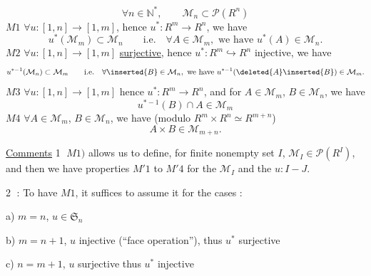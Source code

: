 \[
\forall n\in\mathbb N^*,\qquad\mathcal M_n\subset\mathcal P(R^n)
\]
\textcircled{\scriptsize$M1$} $\forall u:[1,n]\longrightarrow[1,m]$, hence $u^*:R^m\longrightarrow R^n$, we have
\[
u^*(\mathcal M_m)\subset\mathcal M_n\qquad\text{i.e.}\quad\forall A\in\mathcal M_m,\text{ we have }u^*(A)\in\mathcal M_n.
\]
\textcircled{\scriptsize$M2$} $\forall u:[1,n]\longrightarrow[1,m]$ \uline{surjective}, hence $u^*:R^m\hookrightarrow R^n$ injective, we have
\[
u^{*-1}(\mathcal M_n)\subset\mathcal M_m\qquad\text{i.e.}\quad\forall \inserted{B}\in\mathcal M_n,\text{ we have }u^{*-1}(\deleted{A}\inserted{B})\in\mathcal M_m.
\]
\textcircled{\scriptsize$M3$} $\forall u:[1,n]\longrightarrow[1,m]$ hence $u^*:R^m\longrightarrow R^n$, and for $A\in\mathcal M_m$, $B\in\mathcal M_n$, we have
\[
u^{*-1}(B)\cap A\in\mathcal M_m
\]
\textcircled{\scriptsize$M4$} $\forall A\in\mathcal M_m$, $B\in\mathcal M_n$, we have (modulo $R^m\times R^n\simeq R^{m+n}$)
\[
A\times B\in\mathcal M_{m+n}.
\]

\uline{Comments} \textcircled{1} $M1)$ allows us to define, for  finite nonempty set $I$, $\mathcal M_I\in\mathcal P(R^I)$, and then we have properties $M'1$ to $M'4$ for the $\mathcal M_I$ and the $u:I\mathbin{-}J$.

\textcircled{2} : To have $M1$, it suffices to assume it for the  cases :

a) $m=n$, $u\in\mathfrak S_n$

b) $m=n+1$, $u$ injective (``face operation''), thus $u^*$ surjective

c) $n=m+1$, $u$ surjective   thus $u^*$ injective



